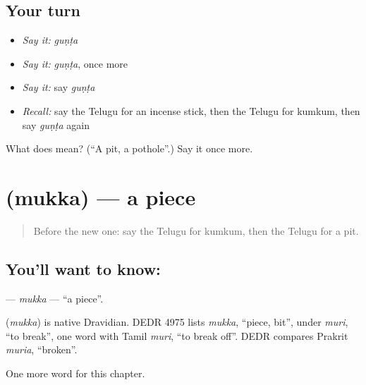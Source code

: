 \subsection*{Your turn}
\begin{itemize}
\raggedright
  \item \emph{Say it:} \emph{guṇṭa}
  \item \emph{Say it:} \emph{guṇṭa}, once more
  \item \emph{Say it:} say \emph{guṇṭa}
  \item \emph{Recall:} say the Telugu for an incense stick, then the Telugu for kumkum, then say \emph{guṇṭa} again
\end{itemize}

\begin{tcolorbox}[breakable,colback=teal!4,colframe=teal!35!black,title={Before you move on}]
What does  mean? (\textquotedblleft{}A pit, a pothole\textquotedblright{}.) Say it once more.
\end{tcolorbox}
\section[\texorpdfstring{\te{ముక్క} (mukka)}{ముక్క (mukka)}]{ (mukka) — a piece}

\label{lesson:TE-C308-mukka}



\begin{quote}
Before the new one: say the Telugu for kumkum, then the Telugu for a pit.
\end{quote}

\subsection*{You'll want to know: }
\textbf{} — \emph{mukka} — \textquotedblleft{}a piece\textquotedblright{}.

\begin{cousinweb}
\textbf{} (\emph{mukka}) is native Dravidian. DEDR 4975 lists \emph{mukka}, \textquotedblleft{}piece, bit\textquotedblright{}, under \emph{muri}, \textquotedblleft{}to break\textquotedblright{}, one word with Tamil \emph{muri}, \textquotedblleft{}to break off\textquotedblright{}. DEDR compares Prakrit \emph{muria}, \textquotedblleft{}broken\textquotedblright{}.
\end{cousinweb}

\begin{grammarlens}[title={What you've built}]
One more word for this chapter.
\end{grammarlens}

